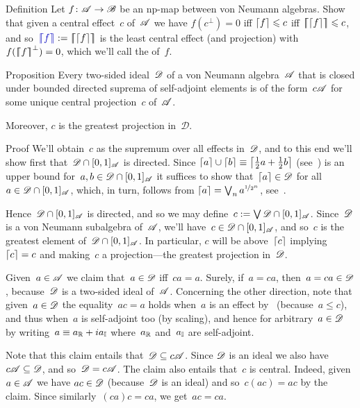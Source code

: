 \documentclass[a]{subfiles}
\begin{document}
\begin{parsec}%
\begin{point}{Definition}%
Let $f\colon \mathscr{A}\to\mathscr{B}$
be an np-map
between von Neumann algebras.
Show that given a central effect~$c$
of~$\mathscr{A}$ we have
$f(c^\perp)=0$
iff $\left\lceil f\right\rceil\leqslant c$
iff $\left\lceil\!\!\left\lceil\left\lceil f\right\rceil\right\rceil\!\!\right\rceil\leqslant c$,
and so~$\Define{\cceil{f}}:=\cceil{\ceil{f}}$
is the least central effect
(and projection)
with~$f(\left\lceil\!\!\left\lceil f\right\rceil\!\!\right\rceil^\perp)=0$,
which we'll call the  of~$f$.
\end{point}
\begin{point}{Proposition}%
\label{prop:weakly-closed-ideal}
Every two-sided ideal~$\mathscr{D}$ of a von Neumann
algebra~$\mathscr{A}$
that is closed under bounded directed suprema of self-adjoint 
elements
is of the form~$c\mathscr{A}$
for some unique central projection~$c$ of~$\mathscr{A}$.

Moreover, $c$ is the greatest projection in~$\mathscr{D}$.
\begin{point}{Proof}%
We'll obtain~$c$ as the supremum over all effects in~$\mathscr{D}$,
and to this end we'll show first that~$\mathscr{D}\cap [0,1]_{\mathscr{A}}$
is directed.
Since $\left\lceil a\right\rceil\cup \left\lceil b\right\rceil \equiv \left\lceil\frac{1}{2}a+\frac{1}{2}b\right\rceil$
(see~)
is an upper bound for~$a,b\in\mathscr{D}\cap [0,1]_{\mathscr{A}}$
it suffices to show that~$\left\lceil a\right\rceil\in \mathscr{D}$
for all~$a\in \mathscr{D}\cap[0,1]_{\mathscr{A}}$,
which, in turn,
follows from
$\left\lceil a\right\rceil=\bigvee_n a^{\nicefrac{1}{2^n}}$,
see~.

Hence~$\mathscr{D}\cap [0,1]_{\mathscr{A}}$ is directed,
and so we may define~$c:=\bigvee \mathscr{D}\cap[0,1]_{\mathscr{A}}$.
Since~$\mathscr{D}$ is a von Neumann subalgebra of~$\mathscr{A}$,
we'll have~$c\in\mathscr{D}\cap[0,1]_{\mathscr{A}}$,
and so~$c$ is the greatest element of~$\mathscr{D}\cap[0,1]_{\mathscr{A}}$.
In particular,
$c$ will be above~$\left\lceil c\right\rceil$ implying~$\left\lceil c\right\rceil=c$
and making~$c$ a projection---the greatest projection in~$\mathscr{D}$.

Given~$a\in\mathscr{A}$ we claim that~$a\in \mathscr{D}$
iff~$ca=a$.
Surely, if~$a=ca$,
then~$a=ca\in \mathscr{D}$,
because~$\mathscr{D}$ is a two-sided ideal of~$\mathscr{A}$.
Concerning the other direction,
note that given~$a\in \mathscr{D}$
the equality~$ac=a$ holds
when~$a$ is an effect by~ (because~$a\leq c$),
and thus when~$a$ is self-adjoint too
(by scaling),
and hence for arbitrary~$a\in\mathscr{D}$
by  writing~$a\equiv a_{\mathbb{R}}+ia_{\mathbb{I}}$
where~$a_{\mathbb{R}}$ and~$a_{\mathbb{I}}$ are self-adjoint.

Note that this claim entails that~$\mathscr{D} \subseteq c\mathscr{A}$.
Since $\mathscr{D}$ is an ideal
we also have~$c\mathscr{A}\subseteq \mathscr{D}$,
and so~$\mathscr{D}= c\mathscr{A}$.
The claim also entails that~$c$ is central.
Indeed,
given~$a\in\mathscr{A}$
we have $ac\in \mathscr{D}$ 
(because~$\mathscr{D}$ is an ideal)
and so~$c(ac)=ac$ by the claim.
Since similarly~$(ca)c=ca$,
we get~$ac=ca$.


\end{point}
\end{point}
\end{parsec}
\end{document}
